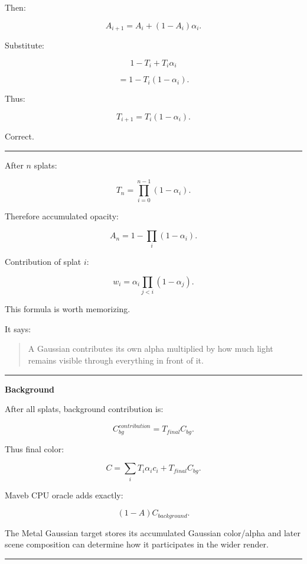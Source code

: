 Then:

\[
A_{i+1}
=
A_i
+
(1-A_i)\alpha_i.
\]

Substitute:

\[
1-T_i
+
T_i\alpha_i
\]

\[
=
1-T_i(1-\alpha_i).
\]

Thus:

\[
T_{i+1}
=
T_i(1-\alpha_i).
\]

Correct.

\begin{center}\rule{0.5\linewidth}{0.5pt}\end{center}

After \(n\) splats:

\[
\boxed{
T_n
=
\prod_{i=0}^{n-1}
(1-\alpha_i).
}
\]

Therefore accumulated opacity:

\[
\boxed{
A_n
=
1-
\prod_i(1-\alpha_i).
}
\]

Contribution of splat \(i\):

\[
\boxed{
w_i
=
\alpha_i
\prod_{j<i}
(1-\alpha_j).
}
\]

This formula is worth memorizing.

It says:

\begin{quote}
A Gaussian contributes its own alpha multiplied by how much light remains visible through everything in front of it.
\end{quote}

\begin{center}\rule{0.5\linewidth}{0.5pt}\end{center}

\textbf{Background}

After all splats, background contribution is:

\[
\boxed{
C_{bg}^{contribution}
=
T_{final}C_{bg}.
}
\]

Thus final color:

\[
\boxed{
C=
\sum_i
T_i\alpha_i c_i
+
T_{final}C_{bg}.
}
\]

Maveb CPU oracle adds exactly:

\[
(1-A)C_{background}.
\]

The Metal Gaussian target stores its accumulated Gaussian color/alpha and later scene composition can determine how it participates in the wider render.

\begin{center}\rule{0.5\linewidth}{0.5pt}\end{center}

